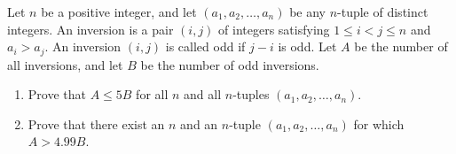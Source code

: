 Let $n$ be a positive integer, and let $(a_1,a_2,\ldots,a_n)$ be any $n$-tuple of distinct integers. An inversion is a pair $(i,j)$ of integers satisfying $1\leq i<j\leq n$ and $a_i>a_j$. An inversion $(i,j)$ is called odd if $j-i$ is odd. Let $A$ be the number of all inversions, and let $B$ be the number of odd inversions.

\begin{enumerate}
\item[(a)] Prove that $A\leq 5B$ for all $n$ and all $n$-tuples $(a_1,a_2,\ldots,a_n)$.
\item[(b)] Prove that there exist an $n$ and an $n$-tuple $(a_1,a_2,\ldots,a_n)$ for which $A>4.99B$.
\end{enumerate}
